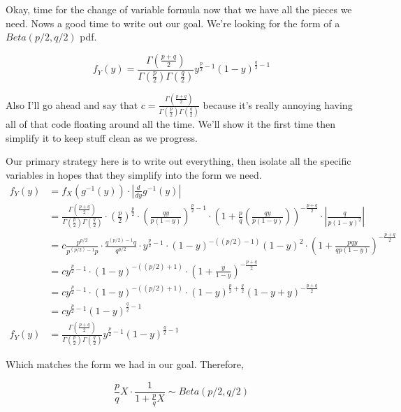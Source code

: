 Okay, time for the change of variable formula now that we have all the pieces we need. Nows a good time to write out our goal. We're looking for the form of a $Beta(p/2, q/2)$ pdf. 

\[
	f_Y(y) = \frac{\Gamma\left( \frac{p+q}{2} \right)}{\Gamma\left( \frac{p}{2} \right) \Gamma\left( \frac{q}{2} \right)}
	y^{\frac{p}{2} - 1} (1-y)^{\frac{q}{2} - 1}
\]

Also I'll go ahead and say that $c = \frac{\Gamma\left( \frac{p+q}{2} \right)}{\Gamma\left( \frac{p}{2} \right) \Gamma\left( \frac{q}{2} \right)}$ because it's really annoying having all of that code floating around all the time. We'll show it the first time then simplify it to keep stuff clean as we progress.

Our primary strategy here is to write out everything, then isolate all the specific variables in hopes that they simplify into the form we need.
\begin{align*}
	f_Y(y) &= f_X(g^{-1}(y)) \cdot \left| \frac{d}{dy} g^{-1}(y) \right| \\ 
	&= \frac{\Gamma\left( \frac{p+q}{2} \right)}{\Gamma\left( \frac{p}{2} \right) \Gamma\left( \frac{q}{2} \right)} 
	\cdot \left( \frac{p}{2} \right)^{\frac{p}{2}} 
	\cdot \left( \frac{qy}{p(1-y)} \right)^{\frac{p}{2} - 1} 
	\cdot \left( 1 + \frac{p}{q}\left( \frac{qy}{p(1-y)} \right) \right)^{-\frac{p+q}{2}}
	\cdot \left| \frac{q}{p(1-y)^2} \right| \\
	&= c \frac{p^{p/2}}{p^{(p/2)-1}p} \cdot \frac{q^{(p/2)-1}q}{q^{p/2}} \cdot y^{\frac{p}{2}-1} \cdot (1-y)^{-((p/2)-1)}(1-y)^2 \cdot \left( 1 + \frac{pqy}{qp(1-y)} \right)^{-\frac{p+q}{2}} \\
	&= c y^{\frac{p}{2}-1} \cdot (1-y)^{-((p/2) + 1)} \cdot \left( 1+\frac{y}{1-y} \right)^{-\frac{p+q}{2}} \\
	&= c y^{\frac{p}{2}-1} \cdot (1-y)^{-((p/2) + 1)} \cdot (1-y)^{\frac{p}{2} + \frac{q}{2}} (1-y+y)^{-\frac{p+q}{2}} \\
	&= c y^{\frac{p}{2}-1} (1-y)^{\frac{q}{2} - 1} \\
	f_Y(y) &= \frac{\Gamma\left( \frac{p+q}{2} \right)}{\Gamma\left( \frac{p}{2} \right) \Gamma\left( \frac{q}{2} \right)} y^{\frac{p}{2}-1} (1-y)^{\frac{q}{2} - 1} 
\end{align*}

Which matches the form we had in our goal. Therefore, 

\[\frac{p}{q}X \cdot \frac{1}{1+\frac{p}{q}X} \sim Beta(p/2, q/2)\]

